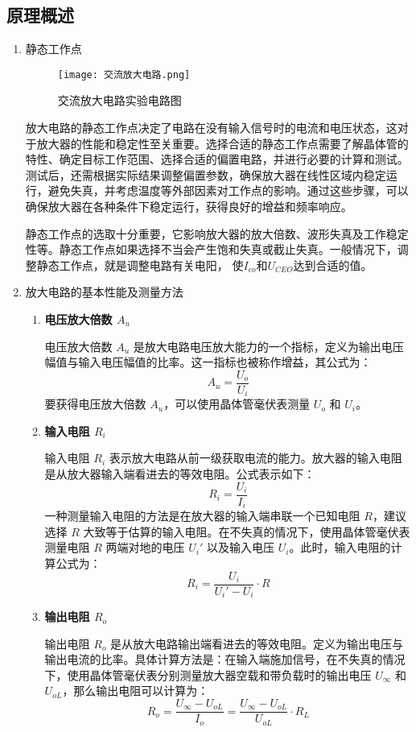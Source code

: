 \documentclass[dvipsnames, svgnames,a4paper,11pt]{article}
\begin{document}
	\subsection{原理概述}
	\begin{enumerate}
		\item 静态工作点
		\begin{figure}[{H}]
			\centering
			\texttt{[image: 交流放大电路.png]}
			\caption{交流放大电路实验电路图}
			\label{}
		\end{figure}

		 放大电路的静态工作点决定了电路在没有输入信号时的电流和电压状态，这对于放大器的性能和稳定性至关重要。选择合适的静态工作点需要了解晶体管的特性、确定目标工作范围、选择合适的偏置电路，并进行必要的计算和测试。测试后，还需根据实际结果调整偏置参数，确保放大器在线性区域内稳定运行，避免失真，并考虑温度等外部因素对工作点的影响。通过这些步骤，可以确保放大器在各种条件下稳定运行，获得良好的增益和频率响应。
		
		静态工作点的选取十分重要，它影响放大器的放大倍数、波形失真及工作稳定性等。静态工作点如果选择不当会产生饱和失真或截止失真。一般情况下，调整静态工作点，就是调整电路有关电阳， 使$I_{co}$和$U_{CEO}$达到合适的值。
		\item 放大电路的基本性能及测量方法
		\begin{enumerate}
\item \textbf{电压放大倍数 $A_u$}

电压放大倍数 $A_u$ 是放大电路电压放大能力的一个指标，定义为输出电压幅值与输入电压幅值的比率。这一指标也被称作增益，其公式为：
$$A_u = \frac{U_o}{U_i}$$
要获得电压放大倍数 $A_u$，可以使用晶体管毫伏表测量 $U_o$ 和 $U_i$。

\item \textbf{输入电阻 $R_i$}

输入电阻 $R_i$ 表示放大电路从前一级获取电流的能力。放大器的输入电阻是从放大器输入端看进去的等效电阻。公式表示如下：
$$R_i = \frac{U_i}{I_i}$$
一种测量输入电阻的方法是在放大器的输入端串联一个已知电阻 $R$，建议选择 $R$ 大致等于估算的输入电阻。在不失真的情况下，使用晶体管毫伏表测量电阻 $R$ 两端对地的电压 $U_i'$ 以及输入电压 $U_i$。此时，输入电阻的计算公式为：
$$R_i = \frac{U_i}{U_i' - U_i} \cdot R$$

\item \textbf{输出电阻 $R_o$}

输出电阻 $R_o$ 是从放大电路输出端看进去的等效电阻。定义为输出电压与输出电流的比率。具体计算方法是：在输入端施加信号，在不失真的情况下，使用晶体管毫伏表分别测量放大器空载和带负载时的输出电压 $U_{\infty}$ 和 $U_{oL}$，那么输出电阻可以计算为：
$$R_o = \frac{U_{\infty} - U_{oL}}{I_o} = \frac{U_{\infty} - U_{oL}}{U_{oL}} \cdot R_L$$


\end{enumerate}

	\end{enumerate}
	
\end{document}

